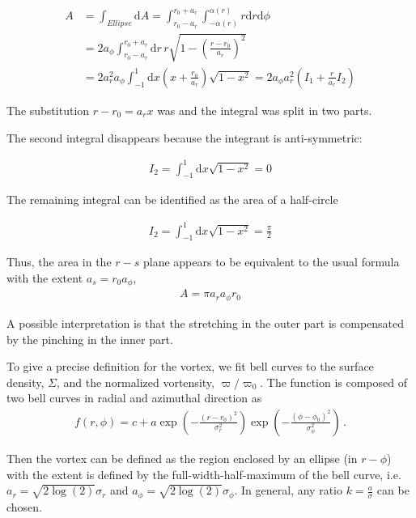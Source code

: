 \documentclass[a4paper]{scrartcl}
\begin{document}
\begin{align}
  A & = \int_{Ellipse} \mathrm{d}A
  = \int_{r_0 - a_r}^{r_0 + a_r} \int_{-\alpha(r)}^{\alpha(r)} r \mathrm{d}r \mathrm{d}\phi                \\
    & = 2 a_\phi \int_{r_0 - a_r}^{r_0 + a_r} \mathrm{d}r \, r \sqrt{1 - \left(\frac{r-r_0}{a_r}\right)^2} \\
    & = 2 a_r^2 a_\phi \int_{-1}^1 \mathrm{d}x \left(x + \frac{r_0}{a_r}\right) \sqrt{1-x^2}
  = 2 a_\phi a_r^2 \left( I_1 + \frac{r}{a_r} I_2 \right)
\end{align}

The substitution $r - r_0 = a_r x$ was and the integral was split in two parts.

The second integral disappears because the integrant is anti-symmetric:

\begin{align}
  I_2 = \int_{-1}^{1} \mathrm{d} x \sqrt{1 - x^2} = 0
\end{align}

The remaining integral can be identified as the area of a half-circle

\begin{align}
  I_2 = \int_{-1}^1 \mathrm{d} x \sqrt{1 - x^2} = \frac{\pi}{2}
\end{align}

Thus, the area in the $r - s$ plane appears to be equivalent to the usual formula with the extent $a_s = r_0 a_\phi$,
\begin{align}
  A = \pi a_r a_\phi r_0
\end{align}

A possible interpretation is that the stretching in the outer part is compensated by the pinching in the inner part.


To give a precise definition for the vortex, we fit bell curves to the surface density, $\Sigma$,
and the normalized vortensity, $\varpi/\varpi_0$.
The function is composed of two bell curves in radial and azimuthal direction as
\begin{align}
  f(r, \phi) = c + a \exp\left( - \frac{(r - r_0)^2}{\sigma_r^2} \right) \exp\left( - \frac{(\phi - \phi_0)^2}{\sigma_\phi^2} \right)\,.
\end{align}

Then the vortex can be defined as the region enclosed by an ellipse (in $r-\phi$)
with the extent is defined by the full-width-half-maximum of the bell curve, i.e. $a_r = \sqrt{2 \log(2)} \sigma_r$
and $a_\phi = \sqrt{2 \log(2)} \sigma_\phi$.
In general, any ratio $k = \frac{a}{\sigma}$ can be chosen.
\end{document}
